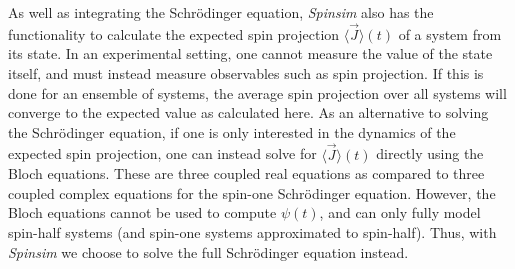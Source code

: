 \documentclass{jors}
\begin{document}


		
		As well as integrating the Schr\"odinger equation, \emph{Spinsim} also has the functionality to calculate the expected spin projection $ \langle \overrightarrow{J}\rangle (t) $ of a system from its state.
		In an experimental setting, one cannot measure the value of the state itself, and must instead measure observables such as spin projection.
		If this is done for an ensemble of systems, the average spin projection over all systems will converge to the expected value as calculated here.
		As an alternative to solving the Schr\"odinger equation, if one is only interested in the dynamics of the expected spin projection, one can instead solve for $ \langle \overrightarrow{J}\rangle (t) $ directly using the Bloch equations\cite{bloch_nuclear_1946}.
		These are three coupled real equations as compared to three coupled complex equations for the spin-one Schr\"odinger equation.
		However, the Bloch equations cannot be used to compute $ \psi(t) $, and can only fully model spin-half systems (and spin-one systems approximated to spin-half).
		Thus, with \emph{Spinsim} we choose to solve the full Schr\"odinger equation instead.
		
\end{document}
